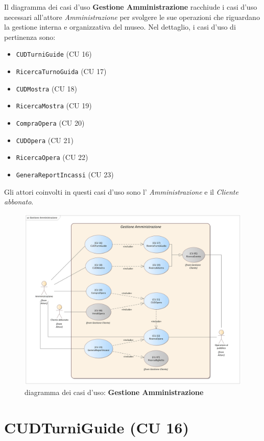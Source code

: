 \documentclass{article}
\begin{document}
\indent\indent Il diagramma dei casi d'uso \textbf{Gestione Amministrazione} racchiude i casi d'uso necessari all'attore \emph{Amministrazione} per svolgere le sue operazioni che riguardano la gestione interna e organizzativa del museo. Nel dettaglio, i casi d'uso di pertinenza sono:
\medskip
\begin{itemize}[itemsep=4pt]
  \item \texttt{CUDTurniGuide} (CU 16)
  \item \texttt{RicercaTurnoGuida} (CU 17)
  \item \texttt{CUDMostra} (CU 18)
  \item \texttt{RicercaMostra} (CU 19)
  \item \texttt{CompraOpera} (CU 20)
  \item \texttt{CUDOpera} (CU 21)
  \item \texttt{RicercaOpera} (CU 22)
  \item \texttt{GeneraReportIncassi} (CU 23)
\end{itemize}
\medskip
Gli attori coinvolti in questi casi d'uso sono l' \emph{Amministrazione} e il \emph{Cliente abbonato}.

\begin{figure}[h]
    \centering
    \includegraphics[width=1\textwidth]{Gestione Amministrazione}
    \caption{diagramma dei casi d'uso: \textbf{Gestione Amministrazione}}
    \label{fig:GestioneAmministrazione}
\end{figure}

\newpage

\section*{CUDTurniGuide (CU 16)}
	
\end{document}
